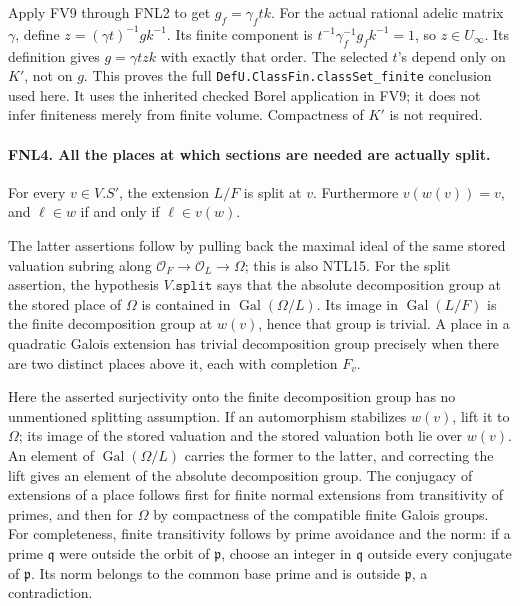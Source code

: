 Apply FV9 through FNL2 to get
\(g_f=\gamma_f t k\).  For the actual rational adelic matrix
\(\gamma\), define \(z=(\gamma t)^{-1}gk^{-1}\).
Its finite component is
\(t^{-1}\gamma_f^{-1}g_f k^{-1}=1\), so \(z\in U_\infty\).
Its definition gives \(g=\gamma t z k\) with exactly that order.
The selected \(t\)'s depend only on \(K'\), not on \(g\).
This proves the full \texttt{DefU.ClassFin.classSet\_finite} conclusion
used here.  It uses the inherited checked Borel application in FV9;
it does not infer finiteness merely from finite volume.  Compactness
of \(K'\) is not required.

\paragraph{FNL4. All the places at which sections are needed are actually split.}
\label{claim:FNL4}
For every \(v\in V.S'\), the extension \(L/F\) is split at \(v\).
Furthermore \(v(w(v))=v\), and
\(\ell\in w\) if and only if \(\ell\in v(w)\).

The latter assertions follow by pulling back the maximal ideal of the
same stored valuation subring along
\(\mathcal O_F\to\mathcal O_L\to\Omega\); this is also NTL15.
For the split assertion, the hypothesis \(V.\texttt{split}\) says
that the absolute decomposition group at the stored place of \(\Omega\)
is contained in \(\operatorname{Gal}(\Omega/L)\).
Its image in \(\operatorname{Gal}(L/F)\) is the finite decomposition
group at \(w(v)\), hence that group is trivial.  A place in a quadratic
Galois extension has trivial decomposition group precisely when there
are two distinct places above it, each with completion \(F_v\).

Here the asserted surjectivity onto the finite decomposition group has
no unmentioned splitting assumption.  If an automorphism stabilizes
\(w(v)\), lift it to \(\Omega\); its image of the stored valuation
and the stored valuation both lie over \(w(v)\).  An element of
\(\operatorname{Gal}(\Omega/L)\) carries the former to the latter,
and correcting the lift gives an element of the absolute decomposition
group.  The conjugacy of extensions of a place follows first for finite
normal extensions from transitivity of primes, and then for \(\Omega\)
by compactness of the compatible finite Galois groups.  For completeness,
finite transitivity follows by prime avoidance and the norm: if a prime
\(\mathfrak q\) were outside the orbit of \(\mathfrak p\), choose an
integer in \(\mathfrak q\) outside every conjugate of \(\mathfrak p\).
Its norm belongs to the common base prime and is outside
\(\mathfrak p\), a contradiction.

